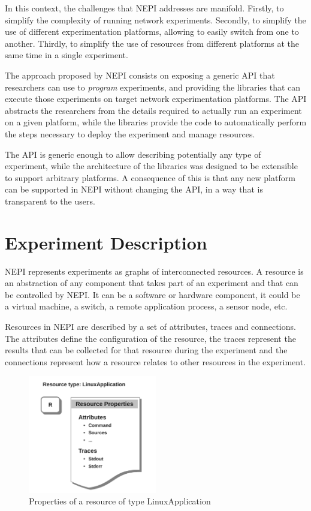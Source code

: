 In this context, the challenges that NEPI addresses are manifold. 
Firstly, to simplify the complexity of running network experiments. 
Secondly, to simplify the use of different experimentation platforms, 
allowing to easily switch from one to another. 
Thirdly, to simplify the
use of resources from different platforms at the same time in 
a single experiment.

The approach proposed by NEPI consists on exposing a generic API
that researchers can use to \emph{program} experiments, and 
providing the libraries that can execute those experiments on 
target network experimentation platforms. The API abstracts the
researchers from the details required to actually run an experiment
on a given platform, while the libraries provide the code to 
automatically perform the steps necessary to deploy the experiment 
and manage resources.

The API is generic enough to allow describing potentially any 
type of experiment, while the architecture of the libraries was 
designed to be extensible to support arbitrary platforms.
A consequence of this is that any new platform can be supported in 
NEPI without changing the API, in a way that is transparent 
to the users.

% 
\section{Experiment Description}

NEPI represents experiments as graphs of interconnected resources.
A resource is an abstraction of any component that takes part of an 
experiment and that can be controlled by NEPI. 
It can be a software or hardware component, it could be a virtual 
machine, a switch, a remote application process, a sensor node, etc.

Resources in NEPI are described by a set of attributes, traces and 
connections. The attributes define the configuration of the resource,
the traces represent the results that can be collected for that resource
during the experiment and the connections represent how a resource relates
to other resources in the experiment.

\begin{figure}[h]
  \centering
  \includegraphics[width=0.5\textwidth]{intro_resource}
  \caption{Properties of a resource of type LinuxApplication}
  \label{fig:intro_resources}
\end{figure}

